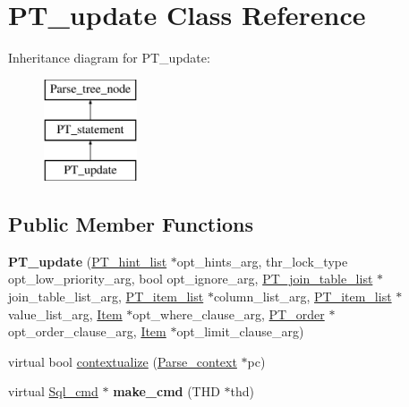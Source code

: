 \hypertarget{classPT__update}{}\section{P\+T\+\_\+update Class Reference}
\label{classPT__update}
Inheritance diagram for P\+T\+\_\+update\+:\begin{figure}[H]
\begin{center}
\leavevmode
\includegraphics[height=3.000000cm]{classPT__update}
\end{center}
\end{figure}
\subsection*{Public Member Functions}
\begin{DoxyCompactItemize}
\item 
\mbox{\label{classPT__update_acbc9f67a9784e989faa5ecb514bbbf2f}} 
{\bfseries P\+T\+\_\+update} (\mbox{\hyperlink{classPT__hint__list}{P\+T\+\_\+hint\+\_\+list}} $\ast$opt\+\_\+hints\+\_\+arg, thr\+\_\+lock\+\_\+type opt\+\_\+low\+\_\+priority\+\_\+arg, bool opt\+\_\+ignore\+\_\+arg, \mbox{\hyperlink{classPT__join__table__list}{P\+T\+\_\+join\+\_\+table\+\_\+list}} $\ast$join\+\_\+table\+\_\+list\+\_\+arg, \mbox{\hyperlink{classPT__item__list}{P\+T\+\_\+item\+\_\+list}} $\ast$column\+\_\+list\+\_\+arg, \mbox{\hyperlink{classPT__item__list}{P\+T\+\_\+item\+\_\+list}} $\ast$value\+\_\+list\+\_\+arg, \mbox{\hyperlink{classItem}{Item}} $\ast$opt\+\_\+where\+\_\+clause\+\_\+arg, \mbox{\hyperlink{classPT__order}{P\+T\+\_\+order}} $\ast$opt\+\_\+order\+\_\+clause\+\_\+arg, \mbox{\hyperlink{classItem}{Item}} $\ast$opt\+\_\+limit\+\_\+clause\+\_\+arg)
\item 
virtual bool \mbox{\hyperlink{classPT__update_a899ec562dc237115c862feb157f75d8e}{contextualize}} (\mbox{\hyperlink{structParse__context}{Parse\+\_\+context}} $\ast$pc)
\item 
\mbox{\label{classPT__update_a37e755527676fbd15c9e0bcedd8118f0}} 
virtual \mbox{\hyperlink{classSql__cmd}{Sql\+\_\+cmd}} $\ast$ {\bfseries make\+\_\+cmd} (T\+HD $\ast$thd)
\end{DoxyCompactItemize}
